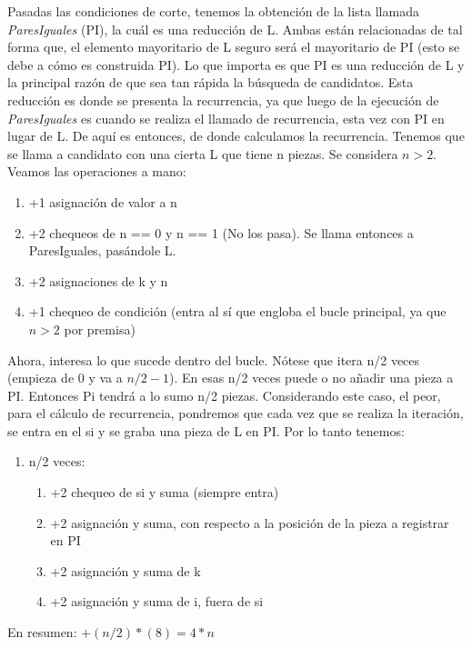 \documentclass{article}
\begin{document}
Pasadas las condiciones de corte, tenemos la obtención de la lista llamada \textit{ParesIguales} (PI), 
la cuál es una reducción de L. Ambas están relacionadas de tal forma que, 
el elemento mayoritario de L seguro será el mayoritario de PI (esto se debe a cómo es construida PI). 
Lo que importa es que PI es una reducción de L y la principal razón de que sea tan rápida la 
búsqueda de candidatos.
Esta reducción es donde se presenta la recurrencia, ya que luego de la ejecución de \textit{ParesIguales} 
es cuando se realiza el llamado de recurrencia, esta vez con PI en lugar de L. 
De aquí es entonces, de donde calculamos la recurrencia.
Tenemos que se llama a candidato con una cierta L que tiene n piezas. Se considera \(n > 2\). 
Veamos las operaciones a mano:

\begin{enumerate}
    \item +1 asignación de valor a n
    \item +2 chequeos de n == 0 y n == 1 (No los pasa). Se llama entonces a ParesIguales, pasándole L.
    \item +2 asignaciones de k y n
    \item +1 chequeo de condición (entra al sí que engloba el bucle principal, ya que \(n > 2\) por premisa)    
\end{enumerate}

Ahora, interesa lo que sucede dentro del bucle. Nótese que itera n/2 veces (empieza de 0 y va a \(n/2 - 1\)). 
En esas n/2 veces puede o no añadir una pieza a PI. 
Entonces Pi tendrá a lo sumo n/2 piezas. 
Considerando este caso, el peor, para el cálculo de recurrencia, 
pondremos que cada vez que se realiza la iteración, 
se entra en el si y se graba una pieza de L en PI. Por lo tanto tenemos:

\begin{enumerate}
    \item n/2 veces:
    \begin{enumerate}
        \item +2 chequeo de si y suma (siempre entra)
        \item +2 asignación y suma, con respecto a la posición de la pieza a registrar en PI
        \item +2 asignación y suma de k
        \item +2 asignación y suma de i, fuera de si
    \end{enumerate}
\end{enumerate}

En resumen: \(+(n/2)*(8) = 4*n\)
\end{document}
